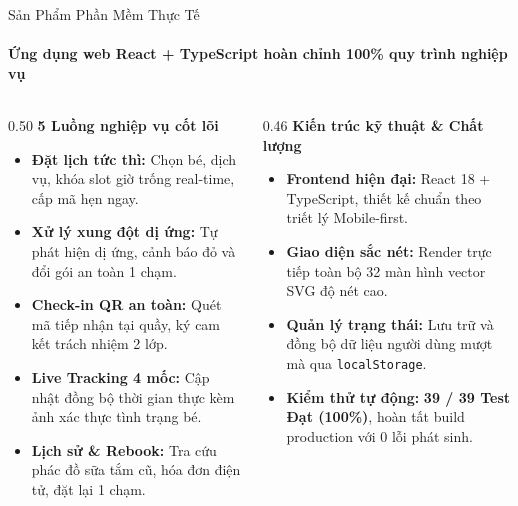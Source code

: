 \begin{frame}{Sản Phẩm Phần Mềm Thực Tế}
  \framesubtitle{\color{white!90}\textbf{Ứng dụng web React + TypeScript hoàn chỉnh 100\% quy trình nghiệp vụ}}

  \begin{columns}[T]
    \begin{column}{0.50\textwidth}
      {\color{PetcarePrimary}\large \textbf{5 Luồng nghiệp vụ cốt lõi}}\\[2mm]
      \small
      \begin{itemize}
        \setlength\itemsep{2.2mm}
        \item \textbf{Đặt lịch tức thì:} Chọn bé, dịch vụ, khóa slot giờ trống real-time, cấp mã hẹn ngay.
        \item \textbf{Xử lý xung đột dị ứng:} Tự phát hiện dị ứng, cảnh báo đỏ và đổi gói an toàn 1 chạm.
        \item \textbf{Check-in QR an toàn:} Quét mã tiếp nhận tại quầy, ký cam kết trách nhiệm 2 lớp.
        \item \textbf{Live Tracking 4 mốc:} Cập nhật đồng bộ thời gian thực kèm ảnh xác thực tình trạng bé.
        \item \textbf{Lịch sử \& Rebook:} Tra cứu phác đồ sữa tắm cũ, hóa đơn điện tử, đặt lại 1 chạm.
      \end{itemize}
    \end{column}

    \begin{column}{0.46\textwidth}
      {\color{PetcarePrimary}\large \textbf{Kiến trúc kỹ thuật \& Chất lượng}}\\[2mm]
      \small
      \begin{itemize}
        \setlength\itemsep{2.5mm}
        \item \textbf{Frontend hiện đại:} React 18 + TypeScript, thiết kế chuẩn theo triết lý Mobile-first.
        \item \textbf{Giao diện sắc nét:} Render trực tiếp toàn bộ 32 màn hình vector SVG độ nét cao.
        \item \textbf{Quản lý trạng thái:} Lưu trữ và đồng bộ dữ liệu người dùng mượt mà qua \texttt{localStorage}.
        \item \textbf{Kiểm thử tự động:} \textbf{39 / 39 Test Đạt (100\%)}, hoàn tất build production với 0 lỗi phát sinh.
      \end{itemize}
    \end{column}
  \end{columns}
\end{frame}
